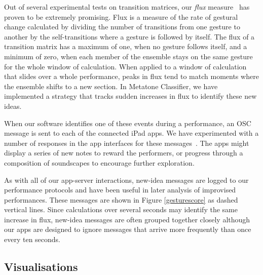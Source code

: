 \documentclass[graybox]{svmult}
\begin{document}
Out of several experimental tests on transition matrices, our
\emph{flux} measure~\cite{Martin:2015jk} has proven to be extremely
promising. Flux is a measure of the rate of gestural change calculated
by dividing the number of transitions from one gesture to another by
the self-transitions where a gesture is followed by itself. The flux
of a transition matrix has a maximum of one, when no gesture follows
itself, and a minimum of zero, when each member of the ensemble stays
on the same gesture for the whole window of calculation. When applied
to a window of calculation that slides over a whole performance, peaks
in flux tend to match moments where the ensemble shifts to a new
section. In Metatone Classifier, we have implemented a strategy that
tracks sudden increases in flux to identify these new ideas.

When our software identifies one of these events during a performance,
an OSC message is sent to each of the connected iPad apps. We have
experimented with a number of responses in the app interfaces for
these messages~\cite{Martin:2015jk}. The apps might display a series
of new notes to reward the performers, or progress through a
composition of soundscapes to encourage further exploration.

As with all of our app-server interactions, new-idea messages are
logged to our performance protocols and have been useful in later
analysis of improvised performances. These messages are shown in
Figure \ref{gesturescore} as dashed vertical lines. Since calculations
over several seconds may identify the same increase in flux, new-idea
messages are often grouped together closely although our apps are
designed to ignore messages that arrive more frequently than once
every ten seconds. 

\subsection{Visualisations}
\label{subsec:visualisations}
\end{document}
